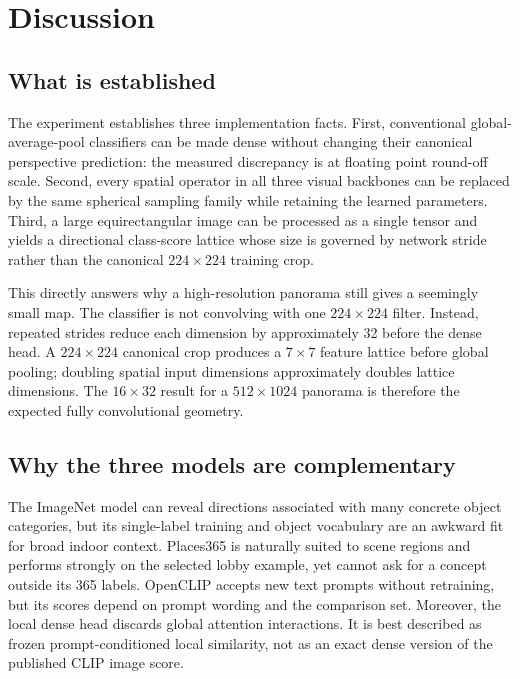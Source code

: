 \documentclass{isprs}
\begin{document}
\section{Discussion}

\subsection{What is established}

The experiment establishes three implementation facts.  First, conventional
global-average-pool classifiers can be made dense without changing their
canonical perspective prediction: the measured discrepancy is at floating
point round-off scale.  Second, every spatial operator in all three visual
backbones can be replaced by the same spherical sampling family while retaining
the learned parameters.  Third, a large equirectangular image can be processed
as a single tensor and yields a directional class-score lattice whose size is
governed by network stride rather than the canonical $224\!\times\!224$
training crop.

This directly answers why a high-resolution panorama still gives a seemingly
small map.  The classifier is not convolving with one $224\!\times\!224$ filter.
Instead, repeated strides reduce each dimension by approximately 32 before the
dense head.  A $224\!\times\!224$ canonical crop produces a $7\!\times\!7$
feature lattice before global pooling; doubling spatial input dimensions
approximately doubles lattice dimensions.  The $16\!\times\!32$ result for a
$512\!\times\!1024$ panorama is therefore the expected fully convolutional
geometry.

\subsection{Why the three models are complementary}

The ImageNet model can reveal directions associated with many concrete object
categories, but its single-label training and object vocabulary are an awkward
fit for broad indoor context.  Places365 is naturally suited to scene regions
and performs strongly on the selected lobby example, yet cannot ask for a
concept outside its 365 labels.  OpenCLIP accepts new text prompts without
retraining, but its scores depend on prompt wording and the comparison set.
Moreover, the local dense head discards global attention interactions.  It is
best described as frozen prompt-conditioned local similarity, not as an exact
dense version of the published CLIP image score.
\end{document}
